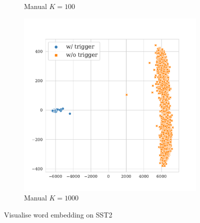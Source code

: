\begin{figure}[!ht]
\begin{subfigure}{.33\textwidth}
  \caption{Manual $K = 100$}
  \label{fig:sst2_manual_k100_embed}
\end{subfigure}
\begin{subfigure}{.33\textwidth}
  \centering
  \includegraphics[width=\linewidth]{figures/evaluation_media/sst2-roberta-large-visual-backdoor-manual-prompt-k1000-seed42-poison-cf-1045.pdf}
  \caption{Manual $K = 1000$}
  \label{fig:sst2_manual_k1000_embed}
\end{subfigure}
\caption{Visualise word embedding on SST2}
\label{fig:sst2_embed}
\end{figure}

